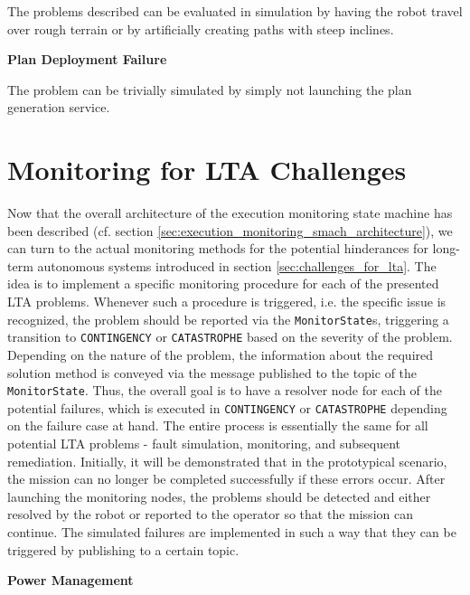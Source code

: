 \documentclass[english, master, utf8]{base/thesis_KBS}
\newcommand{\code}[1]{\colorbox{light-gray}{\texttt{#1}}}
\begin{document}
\noindent
The problems described can be evaluated in simulation by having the robot travel over rough terrain or by artificially creating paths with steep inclines.\newline

\noindent
\textbf{Plan Deployment Failure}\newline

\noindent
The problem can be trivially simulated by simply not launching the plan generation service.\newline

\section{Monitoring for LTA Challenges}
\label{sec:monitoring_for_lta_challenges}

Now that the overall architecture of the execution monitoring state machine has been described (cf. section \ref{sec:execution_monitoring_smach_architecture}),
we can turn to the actual monitoring methods for the potential hinderances for long-term autonomous systems introduced in section \ref{sec:challenges_for_lta}.
The idea is to implement a specific monitoring procedure for each of the presented LTA problems. Whenever such a procedure is triggered, i.e. the specific issue 
is recognized, the problem should be reported via the \code{MonitorState}s, triggering a transition to \code{CONTINGENCY} or \code{CATASTROPHE} based on the severity of the problem.
Depending on the nature of the problem, the information about the required solution method is conveyed via the message published to the topic of the \code{MonitorState}.
Thus, the overall goal is to have a resolver node for each of the potential failures, which is executed in \code{CONTINGENCY} or \code{CATASTROPHE} depending on the
failure case at hand. The entire process is essentially the same for all potential LTA problems - fault simulation, monitoring, and subsequent remediation.
Initially, it will be demonstrated that in the prototypical scenario, the mission can no longer be completed successfully if these errors occur.
After launching the monitoring nodes, the problems should be detected and either resolved by the robot or reported to the operator so that the mission can continue.
The simulated failures are implemented in such a way that they can be triggered by publishing to a certain topic.\newline

\noindent
\textbf{Power Management}\newline
\end{document}
